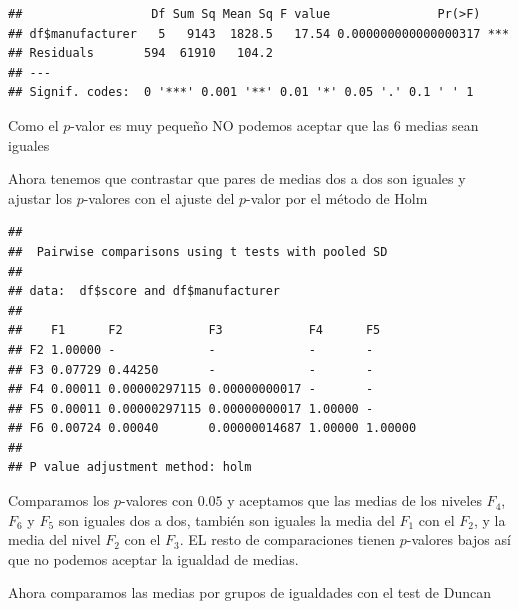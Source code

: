 \documentclass[
]{article}
\newenvironment{Shaded}{\begin{snugshade}}{\end{snugshade}}
\newcommand{\DataTypeTok}[1]{\textcolor[rgb]{0.13,0.29,0.53}{#1}}
\newcommand{\KeywordTok}[1]{\textcolor[rgb]{0.13,0.29,0.53}{\textbf{#1}}}
\newcommand{\NormalTok}[1]{#1}
\newcommand{\OperatorTok}[1]{\textcolor[rgb]{0.81,0.36,0.00}{\textbf{#1}}}
\newcommand{\OtherTok}[1]{\textcolor[rgb]{0.56,0.35,0.01}{#1}}
\newcommand{\StringTok}[1]{\textcolor[rgb]{0.31,0.60,0.02}{#1}}
\begin{document}
\begin{verbatim}
##                  Df Sum Sq Mean Sq F value               Pr(>F)    
## df$manufacturer   5   9143  1828.5   17.54 0.000000000000000317 ***
## Residuals       594  61910   104.2                                 
## ---
## Signif. codes:  0 '***' 0.001 '**' 0.01 '*' 0.05 '.' 0.1 ' ' 1
\end{verbatim}

Como el \(p\)-valor es muy pequeño NO podemos aceptar que las 6 medias
sean iguales

Ahora tenemos que contrastar que pares de medias dos a dos son iguales y
ajustar los \(p\)-valores con el ajuste del \(p\)-valor por el método de
Holm

\begin{Shaded}
\end{Shaded}

\begin{verbatim}
## 
##  Pairwise comparisons using t tests with pooled SD 
## 
## data:  df$score and df$manufacturer 
## 
##    F1      F2            F3            F4      F5     
## F2 1.00000 -             -             -       -      
## F3 0.07729 0.44250       -             -       -      
## F4 0.00011 0.00000297115 0.00000000017 -       -      
## F5 0.00011 0.00000297115 0.00000000017 1.00000 -      
## F6 0.00724 0.00040       0.00000014687 1.00000 1.00000
## 
## P value adjustment method: holm
\end{verbatim}

Comparamos los \(p\)-valores con \(0.05\) y aceptamos que las medias de
los niveles \(F_4\), \(F_6\) y \(F_5\) son iguales dos a dos, también
son iguales la media del \(F_1\) con el \(F_2\), y la media del nivel
\(F_2\) con el \(F_3\). EL resto de comparaciones tienen \(p\)-valores
bajos así que no podemos aceptar la igualdad de medias.

Ahora comparamos las medias por grupos de igualdades con el test de
Duncan

\begin{Shaded}
\end{Shaded}
\end{document}
